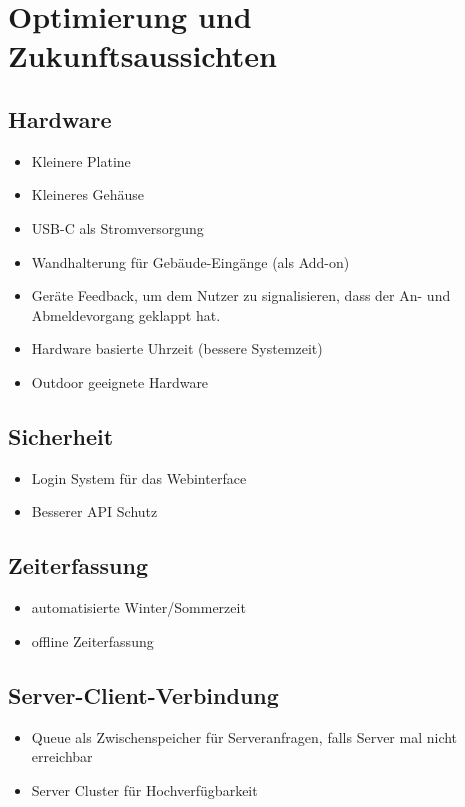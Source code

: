 \documentclass[../main.tex]{subfiles}
\begin{document}
\section{Optimierung und Zukunftsaussichten}

\subsection{Hardware}
\begin{itemize}
  \item Kleinere Platine
  \item Kleineres Gehäuse
  \item USB-C als Stromversorgung
  \item Wandhalterung für Gebäude-Eingänge (als Add-on)
  \item Geräte Feedback, um dem Nutzer zu signalisieren, dass der An- und Abmeldevorgang geklappt hat.
  \item Hardware basierte Uhrzeit (bessere Systemzeit)
  \item Outdoor geeignete Hardware
\end{itemize}

\subsection{Sicherheit}
\begin{itemize}
    \item Login System für das Webinterface 
    \item Besserer API Schutz
\end{itemize}

\subsection{Zeiterfassung}
\begin{itemize} 
    \item automatisierte Winter/Sommerzeit
    \item offline Zeiterfassung
\end{itemize}

\subsection{Server-Client-Verbindung}
\begin{itemize} 
    \item Queue als Zwischenspeicher für Serveranfragen, falls Server mal nicht erreichbar
    \item Server Cluster für Hochverfügbarkeit
\end{itemize}
\end{document}
